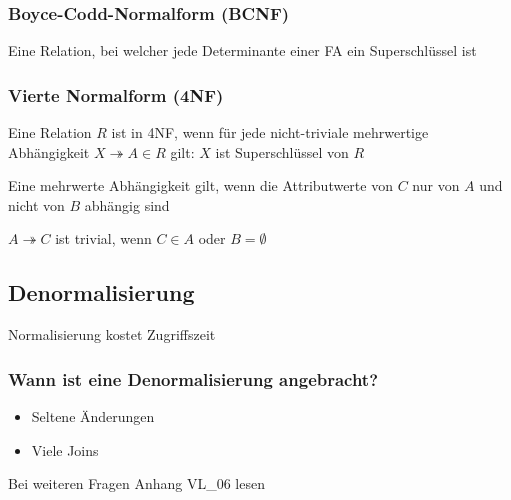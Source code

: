 \subsubsection{Boyce-Codd-Normalform (BCNF)}
Eine Relation, bei welcher jede Determinante einer FA ein Superschlüssel ist
\subsubsection{Vierte Normalform (4NF)}
Eine Relation $R$ ist in 4NF, wenn für jede nicht-triviale mehrwertige Abhängigkeit $X \twoheadrightarrow A\in R$ gilt: $X$ ist Superschlüssel von $R$

Eine mehrwerte Abhängigkeit gilt, wenn die Attributwerte von $C$ nur von $A$ und nicht von $B$ abhängig sind

$A\twoheadrightarrow C$ ist trivial, wenn $C\in A$ oder $B=\emptyset$

\subsection{Denormalisierung}
Normalisierung kostet Zugriffszeit 

\subsubsection{Wann ist eine Denormalisierung angebracht?}
\begin{itemize}
	\item Seltene Änderungen
	\item Viele Joins
\end{itemize}

Bei weiteren Fragen Anhang VL\_06 lesen